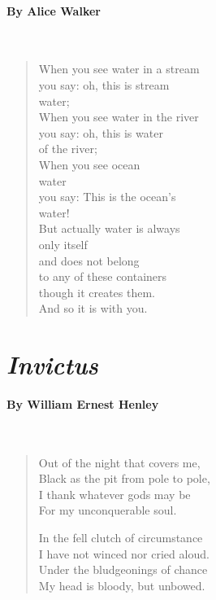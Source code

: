 \documentclass[11pt, letterpaper]{memoir}
\begin{document}
{  \paragraph{By Alice Walker}~
  \begin{verse}
    When you see water in a stream\\
    you say: oh, this is stream\\
    water;\\
    When you see water in the river\\
    you say: oh, this is water\\
    of the river;\\
    When you see ocean\\
    water\\
    you say: This is the ocean's\\
    water!\\
    But actually water is always\\
    only itself\\
    and does not belong\\
    to any of these containers\\
    though it creates them.\\
    And so it is with you.
  \end{verse}

  \hspace{15em}
  \begin{minipage}{0.6\linewidth}
    \section*{\emph{Invictus}}
    \paragraph{By William Ernest Henley}~
    \begin{verse}
      Out of the night that covers me,\\
      \hspace{1em}Black as the pit from pole to pole,\\
      I thank whatever gods may be\\
      \hspace{1em}For my unconquerable soul.
      
      In the fell clutch of circumstance\\
      \hspace{1em}I have not winced nor cried aloud.\\
      Under the bludgeonings of chance\\
      \hspace{1em}My head is bloody, but unbowed.
      

\end{verse}
\end{minipage}}
\end{document}
